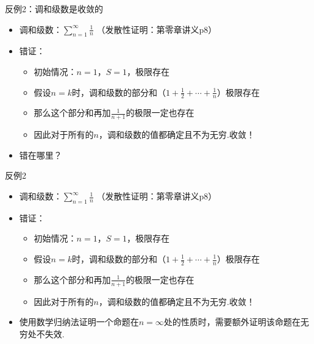 \documentclass[]{beamer}
\begin{document}
\begin{frame}{反例2：调和级数是收敛的}
    \begin{itemize}
        \item 调和级数：$\sum\limits_{n=1}^{\infty}\frac{1}{n}$ （发散性证明：第零章讲义p8）
        
        \item 错证：
        \begin{itemize}
            \item 初始情况：$n=1， S=1$，极限存在
            \item 假设$n=k$时，调和级数的部分和（$1+\frac12+\cdots+\frac1n$）极限存在
            \item 那么这个部分和再加$\frac{1}{n+1}$的极限一定也存在
            \item 因此对于所有的$n$，调和级数的值都确定且不为无穷.收敛！
            
        \end{itemize}
        \item 错在哪里？
    \end{itemize}
\end{frame}


\begin{frame}{反例2}
        \begin{itemize}
        \item 调和级数：$\sum\limits_{n=1}^{\infty}\frac{1}{n}$ （发散性证明：第零章讲义p8）
        
        \item 错证：
        \begin{itemize}
            \item 初始情况：$n=1， S=1$，极限存在
            \item 假设$n=k$时，调和级数的部分和（$1+\frac12+\cdots+\frac1n$）极限存在
            \item 那么这个部分和再加$\frac{1}{n+1}$的极限一定也存在
            \item 因此对于所有的$n$，调和级数的值都确定且不为无穷.收敛！
            
        \end{itemize}
    \end{itemize}
    \begin{itemize}
        \item 使用数学归纳法证明一个命题在$n=\infty$处的性质时，需要额外证明该命题在无穷处不失效.
    \end{itemize}
\end{frame}
\end{document}
